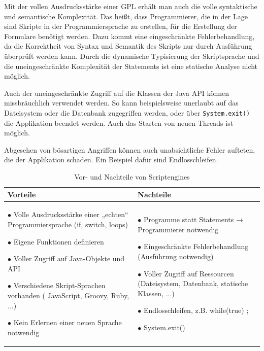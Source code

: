 Mit der vollen Ausdrucksstärke einer GPL erhält man auch die volle syntaktische und semantische Komplexität. Das heißt, dass Programmierer, die in der Lage sind Skripte in der Programmiersprache zu erstellen, für die Erstellung der Formulare benötigt werden. Dazu kommt eine eingeschränkte Fehlerbehandlung, da die Korrektheit von Syntax und Semantik des Skripts nur durch Ausführung überprüft werden kann. Durch die dynamische Typisierung der Skriptsprache und die uneingeschränkte Komplexität der Statements ist eine statische Analyse nicht möglich.

Auch der uneingeschränkte Zugriff auf die Klassen der Java API können missbräuchlich verwendet werden. So kann beispielsweise unerlaubt auf das Dateisystem oder die Datenbank zugegriffen werden, oder über \texttt{System.exit()} die Applikation beendet werden. Auch das Starten von neuen Threads ist möglich. 

Abgesehen von bösartigen Angriffen können auch unabsichtliche Fehler aufteten, die der Applikation schaden. Ein Beispiel dafür sind Endlosschleifen.


\begin{table}
\begin{tabular}{|p{} | p{} |}
	\hline
	Vorteile & Nachteile \\
	\hline

	$\bullet$ Volle Ausdrucksstärke einer „echten“ Programmiersprache (if, switch, loops)
		
	$\bullet$ Eigene Funktionen definieren		 
		 
	$\bullet$ Voller Zugriff auf Java-Objekte und API
		 
	$\bullet$ Verschiedene Skript-Sprachen vorhanden ( JavaScript, Groovy, Ruby, ...)	

	$\bullet$ Kein Erlernen einer neuen Sprache notwendig

	&
	
	$\bullet$ Programme statt Statements → Programmierer notwendig
	
	$\bullet$ Eingeschränkte Fehlerbehandlung (Ausführung notwendig)
	
	$\bullet$ Voller Zugriff auf Ressourcen (Dateisystem, Datenbank, statische Klassen, ...)
	
	$\bullet$ Endlosschleifen, z.B. while(true) { ; }
	
	$\bullet$ System.exit()

	\\
	\hline

\end{tabular}
\caption{Vor- und Nachteile von Scriptengines}
\label{tbl_vergleich_scriptengines}
\end{table}



